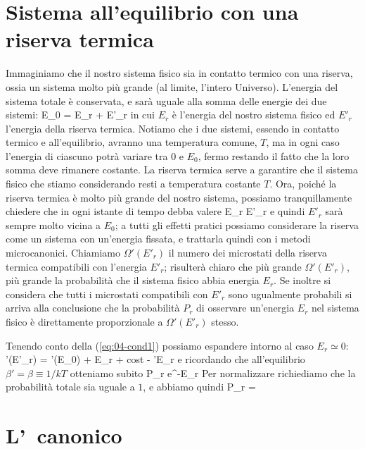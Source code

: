 \section{Sistema all'equilibrio con una riserva termica}
\label{sec:04-equilibrio}

Immaginiamo che il nostro sistema fisico sia in contatto termico con una riserva, ossia un sistema molto più grande (al limite, l'intero Universo). L'energia del sistema totale è conservata, e sarà uguale alla somma delle energie dei due sistemi:
\be
E_0 = E_r + E'_r
\ee
in cui $E_r$ è l'energia del nostro sistema fisico ed $E'_r$ l'energia della riserva termica. Notiamo che i due sistemi, essendo in contatto termico e all'equilibrio, avranno una temperatura comune, $T$, ma in ogni caso l'energia di ciascuno potrà variare tra $0$ e $E_0$, fermo restando il fatto che la loro somma deve rimanere costante. La riserva termica serve a garantire che il sistema fisico che stiamo considerando resti a temperatura costante $T$. Ora, poiché la riserva termica è molto più grande del nostro sistema, possiamo tranquillamente chiedere che in ogni istante di tempo debba valere
\be
\label{eq:04-cond1}
E_r \ll E'_r
\ee
e quindi $E'_r$ sarà sempre molto vicina a $E_0$; a tutti gli effetti pratici possiamo considerare la riserva come un sistema con un'energia fissata, e trattarla quindi con i metodi microcanonici.
Chiamiamo $\Omega'(E'_r)$ il numero dei microstati della riserva termica compatibili con l'energia $E'_r$; risulterà chiaro che più grande $\Omega'(E'_r)$, più grande la probabilità che il sistema fisico abbia energia $E_r$. Se inoltre si considera che tutti i microstati compatibili con $E'_r$ sono ugualmente probabili si arriva alla conclusione che la probabilità $P_r$ di osservare un'energia $E_r$ nel sistema fisico è direttamente proporzionale a $\Omega'(E'_r)$ stesso.

Tenendo conto della (\ref{eq:04-cond1}) possiamo espandere intorno al caso $E_r \simeq 0$:
\be
\ln\Omega'(E'_r) = \ln\Omega'(E_0) + E_r + \cdots \simeq \mbox{\textrm{cost}} - \beta'E_r
\ee
e ricordando che all'equilibrio $\beta' = \beta \equiv 1/kT$ otteniamo subito
\be
P_r \propto e^{-\beta E_r}
\ee
Per normalizzare richiediamo che la probabilità totale sia uguale a $1$, e abbiamo quindi
\be
P_r = 
\ee

\section{L'\ensemble\ canonico}
\label{sec:04-ensemble}

